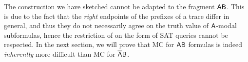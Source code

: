The construction we have sketched cannot be adapted to the fragment $\mathsf{AB}$. This is due to the fact that the \emph{right} endpoints of the prefixes of a trace differ in general, and thus they do not necessarily agree on the truth value of $\mathsf{A}$-modal subformulas, hence the restriction of \TBSATM{} on the form of SAT queries cannot be respected.
In the next section, we will prove that MC for $\mathsf{AB}$ formulas is indeed \emph{inherently} more difficult than MC for $\mathsf{\overline{A}B}$.
%
